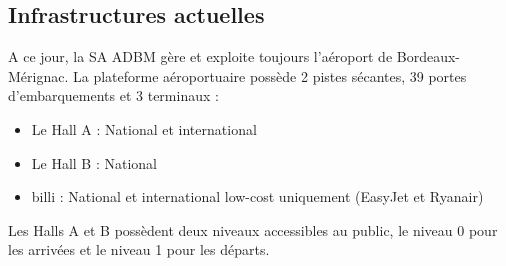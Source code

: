 \newpage

\subsection{Infrastructures actuelles}


A ce jour, la SA ADBM gère et exploite toujours l'aéroport de Bordeaux-Mérignac.
La plateforme aéroportuaire possède 2 pistes sécantes, 39 portes d'embarquements et 3 terminaux :

\begin{itemize}
    \item Le Hall A : National et international
    \item Le Hall B : National
    \item billi : National et international low-cost uniquement (EasyJet et Ryanair)\newline
\end{itemize}

Les Halls A et B possèdent deux niveaux accessibles au public, le niveau 0 pour les arrivées et le niveau 1 pour les départs.

